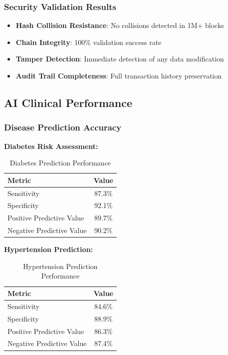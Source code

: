 \documentclass[12pt,a4paper]{article}
\begin{document}
\subsubsection{Security Validation Results}
\begin{itemize}
    \item \textbf{Hash Collision Resistance}: No collisions detected in 1M+ blocks
    \item \textbf{Chain Integrity}: 100\% validation success rate
    \item \textbf{Tamper Detection}: Immediate detection of any data modification
    \item \textbf{Audit Trail Completeness}: Full transaction history preservation
\end{itemize}

\subsection{AI Clinical Performance}

\subsubsection{Disease Prediction Accuracy}

\textbf{Diabetes Risk Assessment:}
\begin{table}[H]
\centering
\caption{Diabetes Prediction Performance}
\begin{tabular}{|l|c|}
\hline
\textbf{Metric} & \textbf{Value} \\
\hline
Sensitivity & 87.3\% \\
Specificity & 92.1\% \\
Positive Predictive Value & 89.7\% \\
Negative Predictive Value & 90.2\% \\
\hline
\end{tabular}
\end{table}

\textbf{Hypertension Prediction:}
\begin{table}[H]
\centering
\caption{Hypertension Prediction Performance}
\begin{tabular}{|l|c|}
\hline
\textbf{Metric} & \textbf{Value} \\
\hline
Sensitivity & 84.6\% \\
Specificity & 88.9\% \\
Positive Predictive Value & 86.3\% \\
Negative Predictive Value & 87.4\% \\
\hline
\end{tabular}
\end{table}
\end{document}
